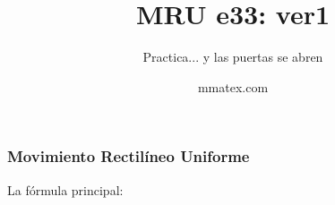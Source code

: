 \documentclass{beamer}
\title{MRU e33: ver1}
\subtitle{Practica... y las puertas se abren}
\author{mmatex.com}
\begin{document}
\maketitle

\begin{frame}
\frametitle{Movimiento Rectil\'ineo Uniforme}
% 
 La f\'ormula principal:

                                                               
 
{\huge \vmru}
\vNUa
                                                               
                                                               
                                                               
                                                               
\end{frame}
\end{document}
